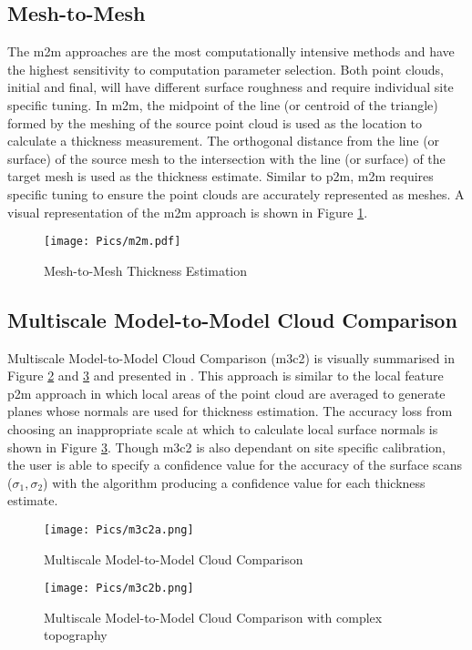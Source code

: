 \subsection{Mesh-to-Mesh}
The \acrshort{m2m} approaches are the most computationally intensive methods and have the highest sensitivity to computation parameter selection. Both point clouds, initial and final, will have different surface roughness and require individual site specific tuning. In \acrshort{m2m}, the midpoint of the line (or centroid of the triangle) formed by the meshing of the source point cloud is used as the location to calculate a thickness measurement. The orthogonal distance from the line (or surface) of the source mesh to the intersection with the line (or surface) of the target mesh is used as the thickness estimate. Similar to \acrshort{p2m}, \acrshort{m2m} requires specific tuning to ensure the point clouds are accurately represented as meshes. A visual representation of the \acrshort{m2m} approach is shown in Figure \ref{fig:m2mdia}.\\
\begin{figure}[h!]
    \centering
    \texttt{[image: Pics/m2m.pdf]}
    \caption{Mesh-to-Mesh Thickness Estimation}
    \label{fig:m2mdia}
\end{figure}
\clearpage
\subsection{Multiscale Model-to-Model Cloud Comparison}

Multiscale Model-to-Model Cloud Comparison (\acrshort{m3c2}) is visually summarised in Figure \ref{fig:m3c2} and \ref{fig:m3c2b} and presented in \cite{thick2}. This approach is similar to the local feature \acrshort{p2m} approach in which local areas of the point cloud are averaged to generate planes whose normals are used for thickness estimation. The accuracy loss from choosing an inappropriate scale at which to calculate local surface normals is shown in Figure \ref{fig:m3c2b}. Though \acrshort{m3c2} is also dependant on site specific calibration, the user is able to specify a confidence value for the accuracy of the surface scans ($\sigma_1,\sigma_2$) with the algorithm producing a confidence value for each thickness estimate.\\

\begin{figure}[h!]
    \centering
    \texttt{[image: Pics/m3c2a.png]}
    \caption{Multiscale Model-to-Model Cloud Comparison \cite{thick1}}
    \label{fig:m3c2}
\end{figure}
\begin{figure}[h!]
    \centering
    \texttt{[image: Pics/m3c2b.png]}
    \caption{Multiscale Model-to-Model Cloud Comparison with complex topography \cite{thick1}}
    \label{fig:m3c2b}
\end{figure}
